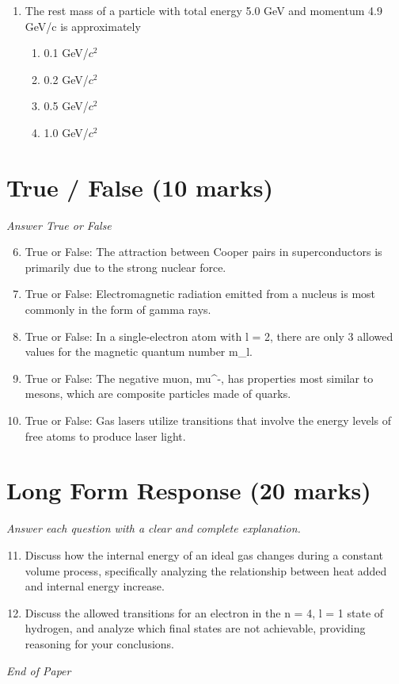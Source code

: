\documentclass[12pt]{article}
\begin{document}
\begin{enumerate}[label=\arabic*.]
\begin{enumerate}[label=(\alph*)]
    \item mc/2
    \item mc/($2^(1$/2))
    \item mc
    \item ($3^(1$/2))mc
\end{enumerate}
\item The rest mass of a particle with total energy 5.0 GeV and momentum 4.9 GeV/c is approximately
\begin{enumerate}[label=(\alph*)]
    \item 0.1 GeV/$c^2$
    \item 0.2 GeV/$c^2$
    \item 0.5 GeV/$c^2$
    \item 1.0 GeV/$c^2$
\end{enumerate}
\end{enumerate}

\section*{True / False (10 marks)}
\textit{Answer True or False}
\begin{enumerate}[label=\arabic*.]
\setcounter{enumi}{5}
\item True or False: The attraction between Cooper pairs in superconductors is primarily due to the strong nuclear force.
\item True or False: Electromagnetic radiation emitted from a nucleus is most commonly in the form of gamma rays.
\item True or False: In a single-electron atom with l = 2, there are only 3 allowed values for the magnetic quantum number m\_l.
\item True or False: The negative muon, mu^-, has properties most similar to mesons, which are composite particles made of quarks.
\item True or False: Gas lasers utilize transitions that involve the energy levels of free atoms to produce laser light.
\end{enumerate}

\section*{Long Form Response (20 marks)}
\textit{Answer each question with a clear and complete explanation.}
\begin{enumerate}[label=\arabic*.]
\setcounter{enumi}{10}
\item Discuss how the internal energy of an ideal gas changes during a constant volume process, specifically analyzing the relationship between heat added and internal energy increase.
\item Discuss the allowed transitions for an electron in the n = 4, l = 1 state of hydrogen, and analyze which final states are not achievable, providing reasoning for your conclusions.
\end{enumerate}

\vfill
\noindent\textit{End of Paper}
\end{document}
